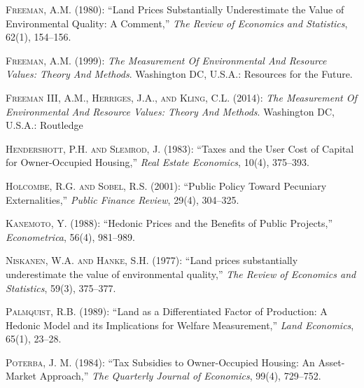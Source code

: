 \documentclass[ecta,nameyear,draft]{econsocart}
\theoremstyle{plain}
\theoremstyle{remark}
\begin{document}
\begin{thebibliography}{}
\textsc{Freeman, A.M.} (1980):
``Land Prices Substantially Underestimate the Value of Environmental Quality: A Comment,''
\textit{The Review of Economics and Statistics}, 62(1), 154--156.
\endbibitem


\textsc{Freeman, A.M.} (1999):
\textit{The Measurement Of Environmental And Resource Values: Theory And Methods}.
Washington DC, U.S.A.: Resources for the Future.
\endbibitem
 
\textsc{Freeman III, A.M., Herriges, J.A., and Kling, C.L.} (2014):
\textit{The Measurement Of Environmental And Resource Values: Theory And Methods}.
Washington DC, U.S.A.: Routledge
\endbibitem 

\textsc{Hendershott, P.H. and Slemrod, J.} (1983):
``Taxes and the User Cost of Capital for Owner-Occupied Housing,''
\textit{Real Estate Economics}, 10(4), 375--393.
\endbibitem

\textsc{Holcombe, R.G. and Sobel, R.S.} (2001):
``Public Policy Toward Pecuniary Externalities,''
\textit{Public Finance Review}, 29(4), 304--325.
\endbibitem

\textsc{Kanemoto, Y.} (1988):
``Hedonic Prices and the Benefits of Public Projects,''
\textit{Econometrica}, 56(4), 981--989.
\endbibitem



\textsc{Niskanen, W.A. and Hanke, S.H.} (1977):
``Land prices substantially underestimate the value of environmental quality,''
\textit{The Review of Economics and Statistics}, 59(3), 375--377.
\endbibitem


\textsc{Palmquist, R.B.} (1989):
``Land as a Differentiated Factor of Production: A Hedonic Model and its Implications for Welfare Measurement,''
\textit{Land Economics}, 65(1), 23--28.
\endbibitem

\textsc{Poterba, J. M.} (1984):
``Tax Subsidies to Owner-Occupied Housing: An Asset-Market Approach,''
\textit{The Quarterly Journal of Economics}, 99(4), 729--752.
\endbibitem


\end{thebibliography}
\end{document}

